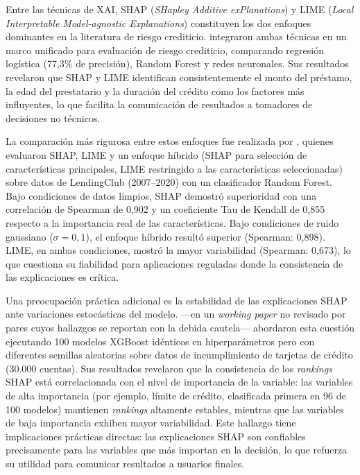 \documentclass[12pt, letterpaper]{article}
\begin{document}
Entre las t\'ecnicas de XAI, SHAP (\textit{SHapley Additive exPlanations}) y LIME (\textit{Local Interpretable Model-agnostic Explanations}) constituyen los dos enfoques dominantes en la literatura de riesgo crediticio. \citet{Oyeyemi2025} integraron ambas t\'ecnicas en un marco unificado para evaluaci\'on de riesgo crediticio, comparando regresi\'on log\'istica (77,3\% de precisi\'on), Random Forest y redes neuronales. Sus resultados revelaron que SHAP y LIME identifican consistentemente el monto del pr\'estamo, la edad del prestatario y la duraci\'on del cr\'edito como los factores m\'as influyentes, lo que facilita la comunicaci\'on de resultados a tomadores de decisiones no t\'ecnicos.

La comparaci\'on m\'as rigurosa entre estos enfoques fue realizada por \citet{Pathi2025}, quienes evaluaron SHAP, LIME y un enfoque h\'ibrido (SHAP para selecci\'on de caracter\'isticas principales, LIME restringido a las caracter\'isticas seleccionadas) sobre datos de LendingClub (2007--2020) con un clasificador Random Forest. Bajo condiciones de datos limpios, SHAP demostr\'o superioridad con una correlaci\'on de Spearman de 0,902 y un coeficiente Tau de Kendall de 0,855 respecto a la importancia real de las caracter\'isticas. Bajo condiciones de ruido gaussiano ($\sigma = 0,1$), el enfoque h\'ibrido result\'o superior (Spearman: 0,898). LIME, en ambas condiciones, mostr\'o la mayor variabilidad (Spearman: 0,673), lo que cuestiona su fiabilidad para aplicaciones reguladas donde la consistencia de las explicaciones es cr\'itica.

Una preocupaci\'on pr\'actica adicional es la estabilidad de las explicaciones SHAP ante variaciones estoc\'asticas del modelo. \citet{Lin2024} ---en un \textit{working paper} no revisado por pares cuyos hallazgos se reportan con la debida cautela--- abordaron esta cuesti\'on ejecutando 100 modelos XGBoost id\'enticos en hiperpar\'ametros pero con diferentes semillas aleatorias sobre datos de incumplimiento de tarjetas de cr\'edito (30.000 cuentas). Sus resultados revelaron que la consistencia de los \textit{rankings} SHAP est\'a correlacionada con el nivel de importancia de la variable: las variables de alta importancia (por ejemplo, l\'imite de cr\'edito, clasificada primera en 96 de 100 modelos) mantienen \textit{rankings} altamente estables, mientras que las variables de baja importancia exhiben mayor variabilidad. Este hallazgo tiene implicaciones pr\'acticas directas: las explicaciones SHAP son confiables precisamente para las variables que m\'as importan en la decisi\'on, lo que refuerza su utilidad para comunicar resultados a usuarios finales.
\end{document}
